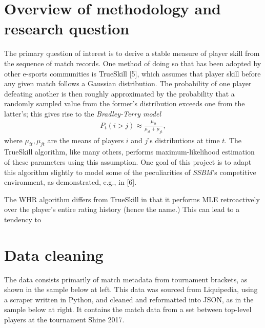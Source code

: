 \documentclass[10pt]{article}
\theoremstyle{definition}
\theoremstyle{remark}
\begin{document}
\section{Overview of methodology and research question}
The primary question of interest is to derive a stable measure of player
skill from the sequence of match records. One method of doing so that
has been adopted by other e-sports communities is TrueSkill {[}5{]},
which assumes that player skill before any given match follows a
Gaussian distribution. The probability of one player defeating another
is then roughly approximated by the probability that a randomly sampled
value from the former's distribution exceeds one from the latter's; this
gives rise to the \emph{Bradley-Terry model}
\begin{align*}
    P_t(i > j) \approx \frac{\mu_{it}}{\mu_{it} + \mu_{jt}},
\end{align*}
where $\mu_{it}, \mu_{jt}$ are the means of players $i$ and $j$'s
distributions at time $t$. The TrueSkill algorithm, like many others,
performs maximum-likelihood estimation of these parameters using this
assumption. One goal of this project is to adapt this algorithm slightly
to model some of the peculiarities of \emph{SSBM}'s competitive
environment, as demonstrated, e.g., in {[}6{]}.

The WHR algorithm differs from TrueSkill in that it performs MLE retroactively
over the player's entire rating history (hence the name.) This can lead to a
tendency to 

\hypertarget{basic-data-model-and-project-workflow}{%
\section{Data cleaning}\label{basic-data-model-and-project-workflow}}

The data consists primarily of match metadata from tournament brackets,
as shown in the sample below at left. This data was sourced from Liquipedia,
using a scraper written in Python, and cleaned and reformatted into JSON, as
in the sample below at right. It contains the match data from a set between
top-level players at the tournament Shine 2017.
\end{document}
